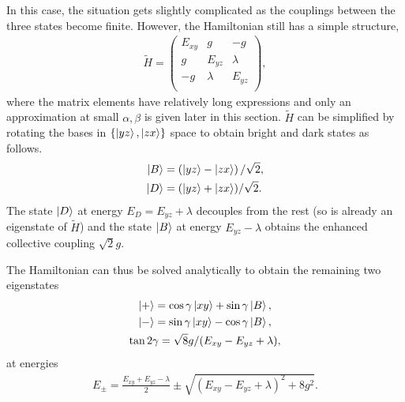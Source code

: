 \documentclass[a4paper,prb,twocolumn]{revtex4-1}  %
\newcommand{\com}[1]{}
\newcommand{\az}[1]{{\color{magenta}{#1}}} %
\begin{document}
In this case, the situation gets slightly complicated as
the couplings between the three states become finite. 
However, 
the Hamiltonian still has a simple structure, 
\begin{align} 
\tilde H = 
\left(
\begin{array}{ccc}
 E_{xy} & g & -g \\
 g & E_{yz} & \lambda  \\
 -g & \lambda  & E_{yz} \\
\end{array}
\right),
\end{align}
where the matrix elements have relatively long expressions and 
only an approximation at small $\alpha,\beta$ is given later in this section.
$\tilde H$ can be simplified by rotating the bases in $\{\ket{yz},\ket{zx}\}$ space
to obtain bright and dark states
as follows.
\begin{align}
\ket{B} &= \left(\ket{yz} - \ket{zx}\right)/\sqrt{2},\\
\ket{D} &=  (\ket{yz} + \ket{zx})/\sqrt{2}.
\end{align}
The state $\ket{D}$ at energy ${E_D= E_{yz}+\lambda}$ decouples 
from the rest (so is already an eigenstate of $\tilde H$) 
and the state $\ket{B}$ at energy ${E_{yz}-\lambda}$ obtains the enhanced collective coupling $\sqrt{2} g$. 
\com{
\begin{align}
\tilde H_{Bright} = 
\left(
\begin{array}{cc}
E_{xy} & \sqrt{2} g \\
\sqrt{2} g & E_{yz}-\lambda
\end{array}
\right).
\end{align}
The Hamiltonian can be solved analytically.
}
The Hamiltonian can thus be solved analytically to
obtain the remaining two
eigenstates
\begin{gather}
\ket{+} = \cos\gamma \ket{xy} + \sin\gamma \ket{B},\\
\ket{-} = \sin\gamma \ket{xy} - \cos\gamma \ket{B},\\
\tan2\gamma = \sqrt{8}g/(E_{xy}-E_{yz}+\lambda),
\end{gather}
at 
energies
\begin{gather}
E_{\pm} = \frac{E_{xy}+E_{yz}-\lambda}{2}  \pm \sqrt{(E_{xy}-E_{yz}+\lambda)^2 + 8g^2 }.
\end{gather}
\end{document}
